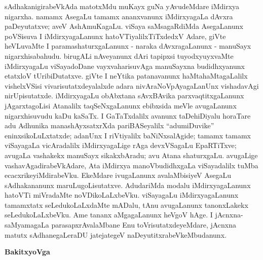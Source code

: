 sAdhakanigirabeVkAda matotxMdu muKayx guNa yAvudeMdare iMdirxya nigarxha. namamx AsegaLu tamamx ananxvanunx iMdirxyagaLa dAvxra paDeyutatxve; aveV AshAmuKagaLu. viSaya saMsagaRdiMda AsegaLanunx poVSisuva I iMdirxyagaLanunx hatoVTiyalilx\-TiTxdedxV Adare, giVte heVLuvaMte I paramashaturxgaLanunx - naraka dAvxragaLanunx - manuSayx nigarxhisabahudu. birugALi nAveyanunx dAri tapipxsi tuyodxyuyxvaMte iMdirxya\-gaLu viSayadoDane vayxvaharisuvAga manuSayxna budidhxyanunx etatxloV tUribiDutatxve. giVte I neYtika patanavanunx haMtahaMtagaLalilx vishelxVSisi vivarisutatxdeyalalxde adara nivAraNoV\-pAyagaLanUnx vishadavAgi nirUpisutatxde. iMdirxyagaLu obAbxtana sAvxBAvika  parxvaqtitxgaLanunx jAgarxtagoLisi Atanalilx taqSeNxgaLanunx ebibxsida meVle avugaLanunx nigarxhisu\-vudu kaDu kaSaTx. I GaTaTxdalilx avanunx taDehiDiyalu horaTare adu Adhunika mana\-shAyxsatxrXda pariBASeyalilx ``adumiDuvike''  eninxsikoLuLxtatxde; \hbox{adanUnx} I riVtiyalilx baNiNxsalAgide; tamamx tamamx viSayagaLa vicAradalilx iMdirxyagaLige rAga devxVSagaLu EpaRTiTxve; avugaLa vashakekx manuSayx sikakxbAradu; avu Atana shaturxgaLu. avugaLige vashavAgadirabeVkAdare, Ata iMdirxya manoVbudidhxgaLa viSayadalilx tuMba ecacxrikeyiMdirabeVku. EkeMdare ivugaLanunx avalaMbisiyeV AsegaLu sAdhakananunx maruLugoLisutatxve. AdudariMda modalu iMdirxyagaLanunx hatoVTi miVradaMte noVDikoLaLxbeVku. viSayagaLu iMdirxyagaLanunx tamamxtatx seLedukoLaLxdaMte mADalu, tAnu avugaLanunx tanonxLakekx seLedukoLaLxbeVku. Ame tananx aMgagaLanunx heVgoV hAge. I jAcnxna-saMyamagaLa parasapxrAvalaMbane Enu toVrisutatxdeyeMdare, jAcnxna matutx sAdhanegaLeraDU jatejategeV naDeyutitxrabeVkeMbudanunx.

\begin{center}
\textbf{\Large{BakitxyoVga}}
\end{center}

